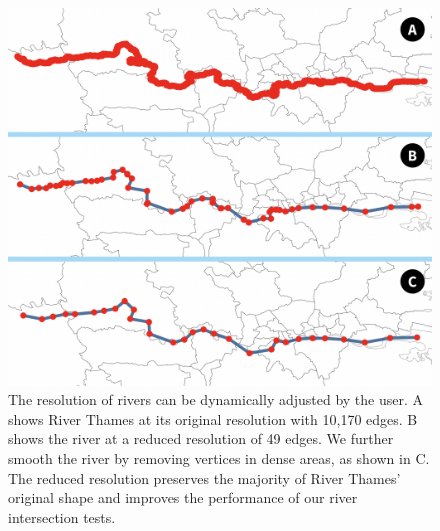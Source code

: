     {
        \begin{figure}[tb!]
            \centering
            \includegraphics[width=\columnwidth,keepaspectratio]{figure/river_resolution.png}
            \caption{The resolution of rivers can be dynamically adjusted by the user. A shows River Thames at its original resolution with 10,170 edges. B shows the river at a reduced resolution of 49 edges. We further smooth the river by removing vertices in dense areas, as shown in C. The reduced resolution preserves the majority of River Thames' original shape and improves the performance of our river intersection tests.}
            \label{fig:river resolution}
        \end{figure}
    }


